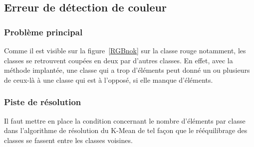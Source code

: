 \subsection{Erreur de détection de couleur}

\subsubsection{Problème principal}

  Comme il est visible sur la figure~\ref{RGBnok} sur la classe rouge notamment, les classes se retrouvent coupées en deux par d'autres classes. 
  En effet, avec la méthode implantée, une classe qui a trop d'éléments peut donné un ou plusieurs de ceux-là à une classe qui est à l'opposé, si elle manque d'éléments. 


  
\subsubsection{Piste de résolution}

  Il faut mettre en place la condition concernant le nombre d'éléments par classe dans l'algorithme de résolution du K-Mean de tel façon que le rééquilibrage des classes se fassent entre les classes voisines. 